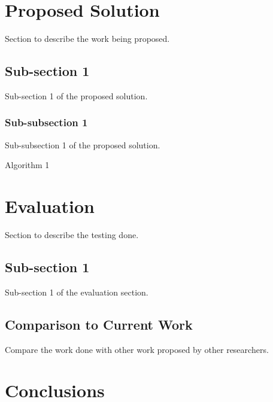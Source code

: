 \documentclass{mscreport}
\begin{document}
\clearpage

\section{Proposed Solution}

Section to describe the work being proposed.

\subsection{Sub-section 1}

Sub-section 1 of the proposed solution.

\subsubsection{Sub-subsection 1}

Sub-subsection 1 of the proposed solution.

\begin{algorithm}
\caption{Algorithm 1}\label{euclid}
\begin{algorithmic}
\Else {}
\EndIf   
\end{algorithmic}
\end{algorithm}

\newpage

\section{Evaluation}

Section to describe the testing done.  

\subsection{Sub-section 1}

Sub-section 1 of the evaluation section.

\subsection{Comparison to Current Work}

Compare the work done with other work proposed by other researchers.
\clearpage

\section{Conclusions}
\end{document}
